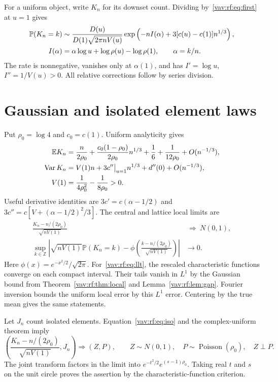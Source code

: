 \documentclass[11pt]{article}
\theoremstyle{remark}\newtheorem{remark}[theorem]{Remark}
\newcommand{\E}{\mathbb E}
\newcommand{\Prob}{\mathbb P}
\newcommand{\Var}{\operatorname{Var}}
\newcommand{\Pois}{\operatorname{Poisson}}
\begin{document}
For a uniform object, write $K_n$ for its downset count. Dividing by~\eqref{vav:rf:eq:first} at $u=1$ gives
\begin{align}\label{vav:rf:eq:ldp}
 \Prob(K_n=k)&\sim\frac{D(u)}{D(1)\sqrt{2\pi nV(u)}}
  \exp\left(-nI(\alpha)+3[c(u)-c(1)]n^{1/3}\right),\\
 I(\alpha)&=\alpha\log u+\log\rho(u)-\log\rho(1),\qquad \alpha=k/n.\notag
\end{align}
The rate is nonnegative, vanishes only at $\alpha(1)$, and has
$I'=\log u$, $I''=1/V(u)>0$. All relative corrections follow by series division.

\section{Gaussian and isolated element laws}\label{vav:rf:sec:laws}
Put $\rho_0=\log4$ and $c_0=c(1)$. Uniform analyticity gives
\begin{align}
 \E K_n={}&\frac{n}{2\rho_0}
 +\frac{c_0(1-\rho_0)}{2\rho_0}n^{1/3}
 +\frac16+\frac{1}{12\rho_0}+O(n^{-1/3}),\label{vav:rf:eq:mean}\\
 \Var K_n={}&V(1)n+3c''\big|_{u=1}n^{1/3}+d''(0)+O(n^{-1/3}),\notag\\
 V(1)={}&\frac{1}{4\rho_0^2}-\frac{1}{8\rho_0}>0.\notag
\end{align}
Useful derivative identities are
$3c'=c(\alpha-1/2)$ and $3c''=c[V+(\alpha-1/2)^2/3]$.
The central and lattice local limits are
\begin{align}
 \frac{K_n-n/(2\rho_0)}{\sqrt{nV(1)}}&\ \Longrightarrow\ N(0,1),\label{vav:rf:eq:clt}\\
 \sup_{k\in\mathbb Z}\left|\sqrt{nV(1)}\Prob(K_n=k)
 -\phi\left(\frac{k-n/(2\rho_0)}{\sqrt{nV(1)}}\right)\right|&\longrightarrow0.\label{vav:rf:eq:llt}
\end{align}
Here $\phi(x)=e^{-x^2/2}/\sqrt{2\pi}$. For~\eqref{vav:rf:eq:llt}, the rescaled characteristic functions converge on each compact interval. Their tails vanish in $L^1$ by the Gaussian bound from Theorem~\ref{vav:rf:thm:local} and Lemma~\ref{vav:rf:lem:gap}. Fourier inversion bounds the uniform local error by this $L^1$ error. Centering by the true mean gives the same statements.

Let $J_n$ count isolated elements. Equation~\eqref{vav:rf:eq:iso} and the complex-uniform theorem imply
\begin{equation}\label{vav:rf:eq:joint}
 \left(\frac{K_n-n/(2\rho_0)}{\sqrt{nV(1)}},J_n\right)
 \Longrightarrow (Z,P),\qquad
 Z\sim N(0,1),\quad P\sim\Pois(\rho_0),\quad Z\perp P.
\end{equation}
The joint transform factors in the limit into $e^{-t^2/2}e^{(s-1)\rho_0}$. Taking real $t$ and $s$ on the unit circle proves the assertion by the characteristic-function criterion.
\end{document}
